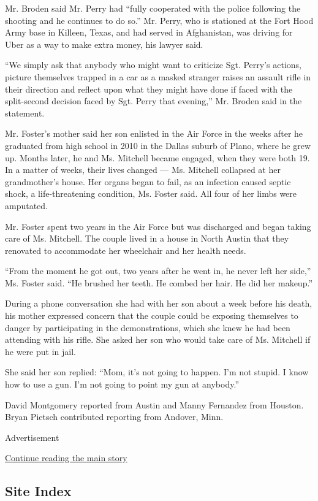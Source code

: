 Mr. Broden said Mr. Perry had ``fully cooperated with the police
following the shooting and he continues to do so.'' Mr. Perry, who is
stationed at the Fort Hood Army base in Killeen, Texas, and had served
in Afghanistan, was driving for Uber as a way to make extra money, his
lawyer said.

``We simply ask that anybody who might want to criticize Sgt. Perry's
actions, picture themselves trapped in a car as a masked stranger raises
an assault rifle in their direction and reflect upon what they might
have done if faced with the split-second decision faced by Sgt. Perry
that evening,'' Mr. Broden said in the statement.

Mr. Foster's mother said her son enlisted in the Air Force in the weeks
after he graduated from high school in 2010 in the Dallas suburb of
Plano, where he grew up. Months later, he and Ms. Mitchell became
engaged, when they were both 19. In a matter of weeks, their lives
changed --- Ms. Mitchell collapsed at her grandmother's house. Her
organs began to fail, as an infection caused septic shock, a
life-threatening condition, Ms. Foster said. All four of her limbs were
amputated.

Mr. Foster spent two years in the Air Force but was discharged and began
taking care of Ms. Mitchell. The couple lived in a house in North Austin
that they renovated to accommodate her wheelchair and her health needs.

``From the moment he got out, two years after he went in, he never left
her side,'' Ms. Foster said. ``He brushed her teeth. He combed her hair.
He did her makeup.''

During a phone conversation she had with her son about a week before his
death, his mother expressed concern that the couple could be exposing
themselves to danger by participating in the demonstrations, which she
knew he had been attending with his rifle. She asked her son who would
take care of Ms. Mitchell if he were put in jail.

She said her son replied: ``Mom, it's not going to happen. I'm not
stupid. I know how to use a gun. I'm not going to point my gun at
anybody.''

David Montgomery reported from Austin and Manny Fernandez from Houston.
Bryan Pietsch contributed reporting from Andover, Minn.

Advertisement

\protect\hyperlink{after-bottom}{Continue reading the main story}

\hypertarget{site-index}{%
\subsection{Site Index}\label{site-index}}

